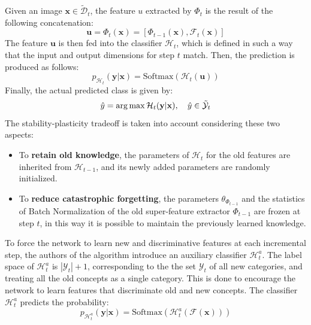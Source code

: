 Given an image $\textbf{x} \in \tilde{\mathcal{D}}_t$, the feature $u$ extracted by $\Phi_t$ is the result of the following concatenation:
\begin{equation}
    \textbf{u} = \Phi_t(\textbf{x}) = [\Phi_{t-1}(\textbf{x}), \mathcal{F}_t(\mathbf{x})]
\end{equation}
The feature $\textbf{u}$ is then fed into the classifier $\mathcal{H}_t$, which is defined in such a way that the input and output dimensions for step $t$ match. Then, the prediction is produced as follows:
\begin{equation} \label{eq:classification}
    p_{\mathcal{H}_t}(\textbf{y} | \textbf{x}) = \text{Softmax}(\mathcal{H}_t(\textbf{u}))
\end{equation}
Finally, the actual predicted class is given by:
\begin{equation}
    \hat{y} = \operatorname*{arg\,max} \mathcal{H}_t(\textbf{y} | \textbf{x}), \quad \hat{y} \in \tilde{\mathcal{Y}}_t
\end{equation}
The stability-plasticity tradeoff is taken into account considering these two aspects:
\begin{itemize}
    \item To \textbf{retain old knowledge}, the parameters of $\mathcal{H}_t$ for the old features are inherited from $\mathcal{H}_{t-1}$, and its newly added parameters are randomly initialized.
    \item To \textbf{reduce catastrophic forgetting}, the parameters $\theta_{\Phi_{t-1}}$ and the statistics of Batch Normalization \cite{ioffe2015batch} of the old super-feature extractor $\Phi_{t-1}$ are frozen at step $t$, in this way it is possible to maintain the previously learned knowledge.
\end{itemize}


To force the network to learn new and discriminative features at each incremental step, the authors of the algorithm introduce an auxiliary classifier $\mathcal{H}_t^a$. The label space of $\mathcal{H}_t^a$ is $|\mathcal{Y}_t| + 1$, corresponding to the the set $\mathcal{Y}_t$ of all new categories, and treating all the old concepts as a single category. This is done to encourage the network to learn features that discriminate old and new concepts. The classifier $\mathcal{H}_t^a$ predicts the probability:
\begin{equation} \label{eq:loss-aux}
    p_{\mathcal{H}_t^a}(\textbf{y}|\textbf{x}) = \text{Softmax}(\mathcal{H}_t^a(\mathcal{F}(\textbf{x})))
\end{equation}


